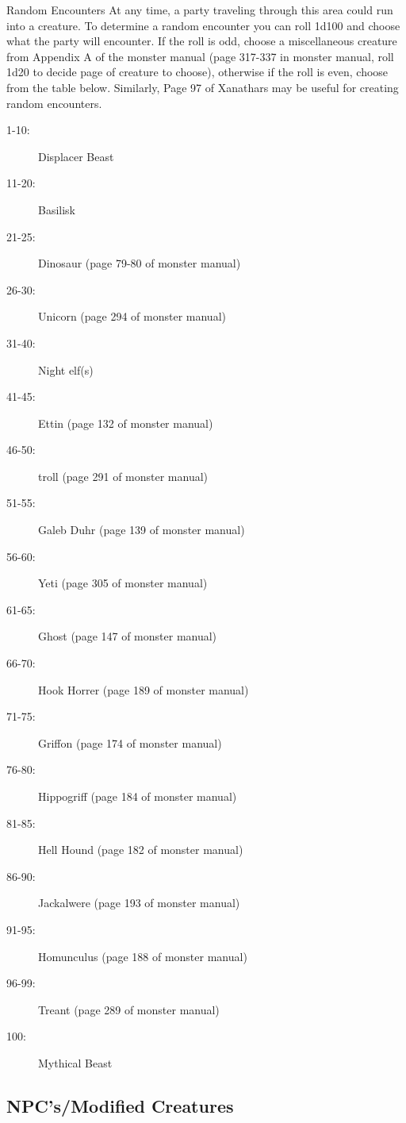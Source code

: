 \documentclass[letterpaper,10pt,twoside,twocolumn,openany]{book}
\begin{document}
\begin{commentbox}{Random Encounters}
	At any time, a party traveling through this area could run into a creature. To determine a random encounter you can roll 1d100 and choose what the party will encounter. If the roll is odd, choose a miscellaneous creature from Appendix A of the monster manual (page 317-337 in monster manual, roll 1d20 to decide page of creature to choose), otherwise if the roll is even, choose from the table below. Similarly, Page 97 of Xanathars may be useful for creating random encounters.
	\begin{description}
		\item[1-10:] Displacer Beast
		\item[11-20:] Basilisk
		\item[21-25:] Dinosaur (page 79-80 of monster manual)
		\item[26-30:] Unicorn (page 294 of monster manual)
		\item[31-40:] Night elf(s)
		\item[41-45:] Ettin (page 132 of monster manual)
		\item[46-50:] troll (page 291 of monster manual)
		\item[51-55:] Galeb Duhr (page 139 of monster manual)
		\item[56-60:] Yeti (page 305 of monster manual)
		\item[61-65:] Ghost (page 147 of monster manual)
		\item[66-70:] Hook Horrer (page 189 of monster manual)
		\item[71-75:] Griffon (page 174 of monster manual)
		\item[76-80:] Hippogriff (page 184 of monster manual)
		\item[81-85:] Hell Hound (page 182 of monster manual)
		\item[86-90:] Jackalwere (page 193 of monster manual)
		\item[91-95:] Homunculus (page 188 of monster manual)
		\item[96-99:] Treant (page 289 of monster manual)
		\item[100:] Mythical Beast
	\end{description}
\end{commentbox}

\subsection{NPC's/Modified Creatures}
\end{document}
